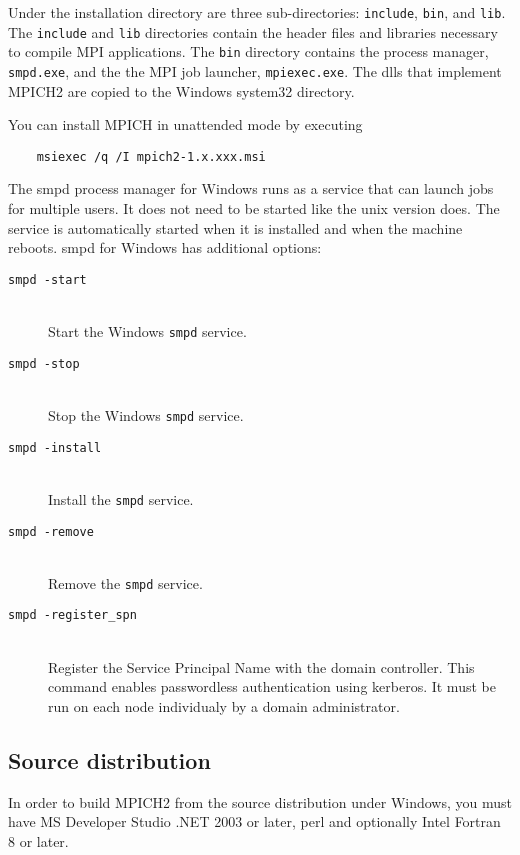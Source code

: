 \documentclass[dvipdfm,11pt]{article}
\begin{document}
Under the installation directory are three sub-directories: \texttt{include},
 \texttt{bin}, and \texttt{lib}.  The \texttt{include} and \texttt{lib} 
directories contain the header files and libraries necessary to compile MPI 
applications.  The \texttt{bin} directory contains the process manager, 
\texttt{smpd.exe}, and the the MPI job launcher, \texttt{mpiexec.exe}.  The
dlls that implement MPICH2 are copied to the Windows system32 directory.

You can install MPICH in unattended mode by executing 
\begin{verbatim}
    msiexec /q /I mpich2-1.x.xxx.msi
\end{verbatim}

The smpd process manager for Windows runs as a service that can launch jobs 
for multiple users.  It does not need to be started like the unix version 
does.  The service is automatically started when it is installed and when 
the machine reboots.  smpd for Windows has additional options:
\begin{description}
\item[\texttt{smpd -start}]\mbox{}\\
Start the Windows \texttt{smpd} service.
\item[\texttt{smpd -stop}]\mbox{}\\
Stop the Windows \texttt{smpd} service.
\item[\texttt{smpd -install}]\mbox{}\\
Install the \texttt{smpd} service.
\item[\texttt{smpd -remove}]\mbox{}\\
Remove the \texttt{smpd} service.
\item[\texttt{smpd -register\_spn}]\mbox{}\\
Register the Service Principal Name with the domain controller.
This command enables passwordless authentication using kerberos.  It must be 
run on each node individualy by a domain administrator.
\end{description}

\subsection{Source distribution}
\label{sec:winsrc}

In order to build MPICH2 from the source distribution under Windows, 
you must have MS Developer Studio .NET 2003 or later, perl and optionally 
Intel Fortran 8 or later.
\end{document}

